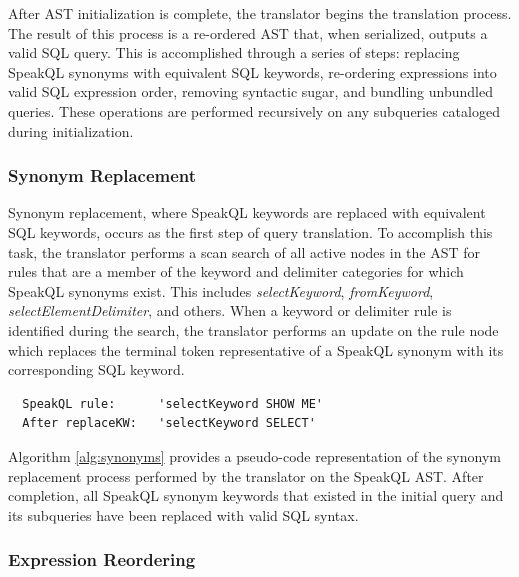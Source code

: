 After AST initialization is complete, the translator begins the translation process. The result of this process is a re-ordered AST that, when serialized, outputs a valid SQL query. This is accomplished through a series of steps: replacing SpeakQL synonyms with equivalent SQL keywords, re-ordering expressions into valid SQL expression order, removing syntactic sugar, and bundling unbundled queries. These operations are performed recursively on any subqueries cataloged during initialization.

\subsubsection{Synonym Replacement}

Synonym replacement, where SpeakQL keywords are replaced with equivalent SQL keywords, occurs as the first step of query translation. To accomplish this task, the translator performs a scan search of all active nodes in the AST for rules that are a member of the keyword and delimiter categories for which SpeakQL synonyms exist. This includes \emph{selectKeyword}, \emph{fromKeyword}, \emph{selectElementDelimiter}, and others. When a keyword or delimiter rule is identified during the search, the translator performs an update on the rule node which replaces the terminal token representative of a SpeakQL synonym with its corresponding SQL keyword.

\begin{verbatim}
  SpeakQL rule:      'selectKeyword SHOW ME'
  After replaceKW:   'selectKeyword SELECT'
\end{verbatim}

Algorithm \ref{alg:synonyms} provides a pseudo-code representation of the synonym replacement process performed by the translator on the SpeakQL AST. After completion, all SpeakQL synonym keywords that existed in the initial query and its subqueries have been replaced with valid SQL syntax.

\ReplaceSynonymsAlgorithm

\subsubsection{Expression Reordering}

